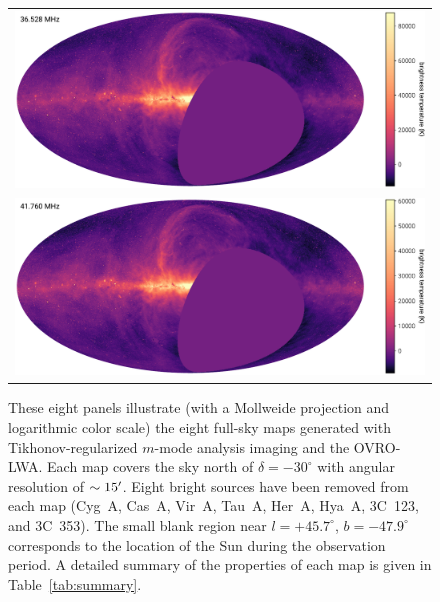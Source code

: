 \documentclass[twocolumn]{aastex61}
\begin{document}
\begin{figure}[ht]
    \centering
    \begin{tabular}{c}
        \includegraphics[height=0.32\textheight]{figures/channel-maps/spw04} \\
        \includegraphics[height=0.32\textheight]{figures/channel-maps/spw06} \\
    \end{tabular}
    \caption{
        These eight panels illustrate (with a Mollweide projection and logarithmic color scale) the
        eight full-sky maps generated with Tikhonov-regularized $m$-mode analysis imaging and the
        OVRO-LWA.  Each map covers the sky north of $\delta=-30^\circ$ with angular resolution of
        $\sim15\mbox{$^\prime$}$. Eight bright sources have been removed from each map (Cyg~A, Cas~A, Vir~A,
        Tau~A, Her~A, Hya~A, 3C~123, and 3C~353). The small blank region near $l=+45.7^\circ$,
        $b=-47.9^\circ$ corresponds to the location of the Sun during the observation period.  A
        detailed summary of the properties of each map is given in Table~\ref{tab:summary}.
    }
    \label{fig:channel-maps}
\end{figure}
\end{document}
